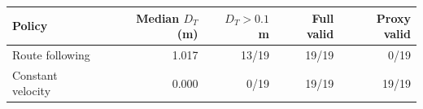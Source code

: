 \begin{tabular}{lrrrr}
\toprule
Policy & Median $D_T$ (m) & $D_T>0.1$ m & Full valid & Proxy valid \\
\midrule
Route following & 1.017 & 13/19 & 19/19 & 0/19 \\
Constant velocity & 0.000 & 0/19 & 19/19 & 19/19 \\
\bottomrule
\end{tabular}
